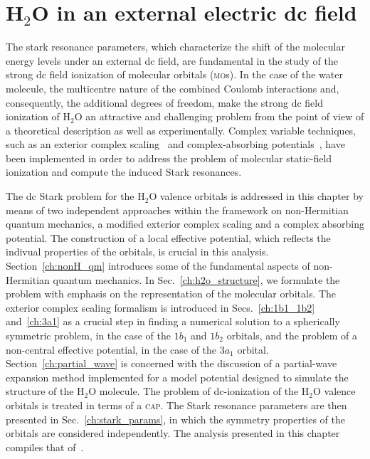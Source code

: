 \chapter{H$_{2}$O in an external electric dc field}
\label{ch:dc_h2o}


The stark resonance parameters, which characterize the shift of the
molecular energy levels under an external dc field, are fundamental in
the study of the strong dc field ionization of molecular orbitals
(\textsc{mo}s). In the case of the water molecule, the multicentre
nature of the combined Coulomb interactions and, consequently, the
additional degrees of freedom, make the strong dc field ionization of
H$_{2}$O an attractive and challenging problem from the point of view
of a theoretical description as well as experimentally. Complex
variable techniques, such as an exterior complex
scaling~\cite{Simon_1979,ecsScrinzi} and complex-absorbing
potentials~\cite{RissMeyer_1993,Krause_2014}, have been implemented in
order to address the problem of molecular static-field ionization and
compute the induced Stark resonances.

The dc Stark problem for the H$_{2}$O valence orbitals is addressed in
this chapter by means of two independent approaches within the
framework on non-Hermitian quantum mechanics, a modified exterior
complex scaling and a complex absorbing potential. The construction of
a local effective potential, which reflects the indivual properties of
the orbitals, is crucial in this analysis. Section~\ref{ch:nonH_qm}
introduces some of the fundamental aspects of non-Hermitian quantum
mechanics. In Sec.~\ref{ch:h2o_structure}, we formulate the problem
with emphasis on the representation of the molecular orbitals. The
exterior complex scaling formalism is introduced in
Secs.~\ref{ch:1b1_1b2} and~\ref{ch:3a1} as a crucial step in finding a
numerical solution to a spherically symmetric problem, in the case of
the $1b_{1}$ and $1b_{2}$ orbitals, and the problem of a non-central
effective potential, in the case of the $3a_{1}$
orbital. Section~\ref{ch:partial_wave} is concerned with the
discussion of a partial-wave expansion method implemented for a model
potential designed to simulate the structure of the H$_{2}$O
molecule. The problem of dc-ionization of the H$_{2}$O valence
orbitals is treated in terms of a \textsc{cap}. The Stark resonance
parameters are then presented in Sec.~\ref{ch:stark_params}, in which
the symmetry properties of the orbitals are considered
independently. The analysis presented in this chapter compiles that
of~\cite{sarias_2016,sarias_2017}.


